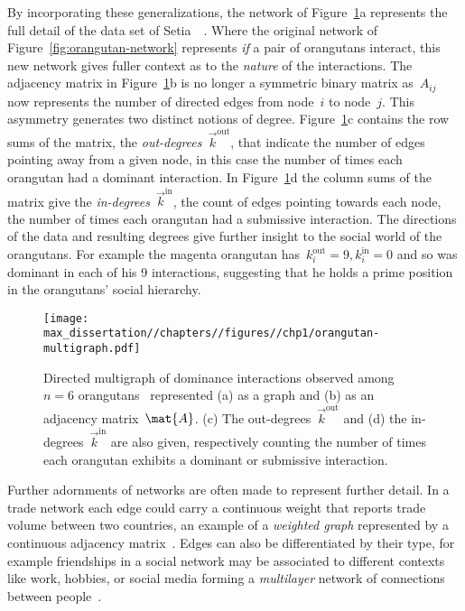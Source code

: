 By incorporating these generalizations, the network of Figure~\ref{fig:orangutan-multigraph}a represents the full detail of the data set of Setia~\etal~\cite{SV07}. Where the original network of Figure~\ref{fig:orangutan-network} represents \emph{if} a pair of orangutans interact, this new network gives fuller context as to the \emph{nature} of the interactions. The adjacency matrix in Figure~\ref{fig:orangutan-multigraph}b is no longer a symmetric binary matrix as~$A_{ij}$ now represents the number of directed edges from node~$i$ to node~$j$. This asymmetry generates two distinct notions of degree. Figure~\ref{fig:orangutan-multigraph}c contains the row sums of the matrix, the \emph{out-degrees}~$\vec{k}^{\text{out}}$, that indicate the number of edges pointing away from a given node, in this case the number of times each orangutan had a dominant interaction. In Figure~\ref{fig:orangutan-multigraph}d the column sums of the matrix give the \emph{in-degrees}~$\vec{k}^{\text{in}}$, the count of edges pointing towards each node, the number of times each orangutan had a submissive interaction. The directions of the data and resulting degrees give further insight to the social world of the orangutans. For example the magenta orangutan has~$k_i^{\text{out}} = 9, k_i^{\text{in}} = 0$ and so was dominant in each of his 9 interactions, suggesting that he holds a prime position in the orangutans' social hierarchy. 

\begin{figure}
    \centering
    \texttt{[image: max\_dissertation//chapters//figures//chp1/orangutan-multigraph.pdf]}
    \caption{Directed multigraph of dominance interactions observed among $n = 6$ orangutans~\cite{SV07} represented (a) as a graph and (b) as an adjacency matrix~$\mat{A}$. (c) The out-degrees~$\vec{k}^{\text{out}}$ and (d) the in-degrees~$\vec{k}^{\text{in}}$ are also given, respectively counting the number of times each orangutan exhibits a dominant or submissive interaction.}
    \label{fig:orangutan-multigraph}
\end{figure}

Further adornments of networks are often made to represent further detail. In a trade network each edge could carry a continuous weight that reports trade volume between two countries, an example of a \emph{weighted graph} represented by a continuous adjacency matrix~\cite{DNAL15}. Edges can also be differentiated by their type, for example friendships in a social network may be associated to different contexts like work, hobbies, or social media forming a \emph{multilayer} network of connections between people~\cite{CGZ13, Kivela14}. 

